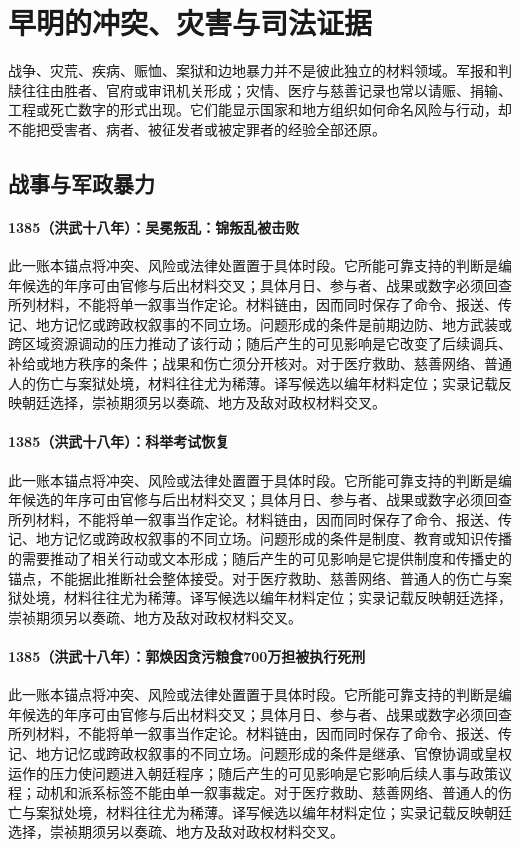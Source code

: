 \section{早明的冲突、灾害与司法证据}

战争、灾荒、疾病、赈恤、案狱和边地暴力并不是彼此独立的材料领域。军报和判牍往往由胜者、官府或审讯机关形成；灾情、医疗与慈善记录也常以请赈、捐输、工程或死亡数字的形式出现。它们能显示国家和地方组织如何命名风险与行动，却不能把受害者、病者、被征发者或被定罪者的经验全部还原。

\subsection{战事与军政暴力}

\paragraph{1385（洪武十八年）：吴冕叛乱：锦叛乱被击败} 此一账本锚点将冲突、风险或法律处置置于具体时段。它所能可靠支持的判断是编年候选的年序可由官修与后出材料交叉；具体月日、参与者、战果或数字必须回查所列材料，不能将单一叙事当作定论。材料链由，因而同时保存了命令、报送、传记、地方记忆或跨政权叙事的不同立场。问题形成的条件是前期边防、地方武装或跨区域资源调动的压力推动了该行动；随后产生的可见影响是它改变了后续调兵、补给或地方秩序的条件；战果和伤亡须分开核对。对于医疗救助、慈善网络、普通人的伤亡与案狱处境，材料往往尤为稀薄。译写候选以编年材料定位；实录记载反映朝廷选择，崇祯期须另以奏疏、地方及敌对政权材料交叉。

\paragraph{1385（洪武十八年）：科举考试恢复} 此一账本锚点将冲突、风险或法律处置置于具体时段。它所能可靠支持的判断是编年候选的年序可由官修与后出材料交叉；具体月日、参与者、战果或数字必须回查所列材料，不能将单一叙事当作定论。材料链由，因而同时保存了命令、报送、传记、地方记忆或跨政权叙事的不同立场。问题形成的条件是制度、教育或知识传播的需要推动了相关行动或文本形成；随后产生的可见影响是它提供制度和传播史的锚点，不能据此推断社会整体接受。对于医疗救助、慈善网络、普通人的伤亡与案狱处境，材料往往尤为稀薄。译写候选以编年材料定位；实录记载反映朝廷选择，崇祯期须另以奏疏、地方及敌对政权材料交叉。

\paragraph{1385（洪武十八年）：郭焕因贪污粮食700万担被执行死刑} 此一账本锚点将冲突、风险或法律处置置于具体时段。它所能可靠支持的判断是编年候选的年序可由官修与后出材料交叉；具体月日、参与者、战果或数字必须回查所列材料，不能将单一叙事当作定论。材料链由，因而同时保存了命令、报送、传记、地方记忆或跨政权叙事的不同立场。问题形成的条件是继承、官僚协调或皇权运作的压力使问题进入朝廷程序；随后产生的可见影响是它影响后续人事与政策议程；动机和派系标签不能由单一叙事裁定。对于医疗救助、慈善网络、普通人的伤亡与案狱处境，材料往往尤为稀薄。译写候选以编年材料定位；实录记载反映朝廷选择，崇祯期须另以奏疏、地方及敌对政权材料交叉。


